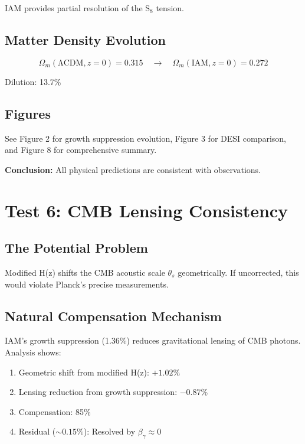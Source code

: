 \documentclass[11pt,letterpaper]{article}
\begin{document}
\noindent IAM provides partial resolution of the S$_8$ tension.

\subsection{Matter Density Evolution}

\begin{equation}
\Omega_m(\text{ΛCDM}, z=0) = 0.315 \quad \rightarrow \quad \Omega_m(\text{IAM}, z=0) = 0.272
\end{equation}

\noindent Dilution: 13.7\%

\subsection{Figures}

See Figure 2 for growth suppression evolution, Figure 3 for DESI comparison, and Figure 8 for comprehensive summary.

\noindent\textbf{Conclusion:} All physical predictions are consistent with observations.

\section{Test 6: CMB Lensing Consistency}

\subsection{The Potential Problem}

Modified H(z) shifts the CMB acoustic scale $\theta_s$ geometrically. If uncorrected, this would violate Planck's precise measurements.

\subsection{Natural Compensation Mechanism}

IAM's growth suppression (1.36\%) reduces gravitational lensing of CMB photons. Analysis shows:

\begin{enumerate}
\item Geometric shift from modified H(z): $+1.02\%$
\item Lensing reduction from growth suppression: $-0.87\%$
\item Compensation: 85\%
\item Residual ($\sim 0.15\%$): Resolved by $\beta_\gamma \approx 0$
\end{enumerate}
\end{document}
